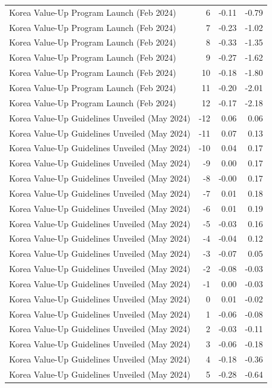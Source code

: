 \begin{table}
\begin{tabular}{lrrr}
Korea Value-Up Program Launch (Feb 2024) & 6 & -0.11 & -0.79 \\
Korea Value-Up Program Launch (Feb 2024) & 7 & -0.23 & -1.02 \\
Korea Value-Up Program Launch (Feb 2024) & 8 & -0.33 & -1.35 \\
Korea Value-Up Program Launch (Feb 2024) & 9 & -0.27 & -1.62 \\
Korea Value-Up Program Launch (Feb 2024) & 10 & -0.18 & -1.80 \\
Korea Value-Up Program Launch (Feb 2024) & 11 & -0.20 & -2.01 \\
Korea Value-Up Program Launch (Feb 2024) & 12 & -0.17 & -2.18 \\
Korea Value-Up Guidelines Unveiled (May 2024) & -12 & 0.06 & 0.06 \\
Korea Value-Up Guidelines Unveiled (May 2024) & -11 & 0.07 & 0.13 \\
Korea Value-Up Guidelines Unveiled (May 2024) & -10 & 0.04 & 0.17 \\
Korea Value-Up Guidelines Unveiled (May 2024) & -9 & 0.00 & 0.17 \\
Korea Value-Up Guidelines Unveiled (May 2024) & -8 & -0.00 & 0.17 \\
Korea Value-Up Guidelines Unveiled (May 2024) & -7 & 0.01 & 0.18 \\
Korea Value-Up Guidelines Unveiled (May 2024) & -6 & 0.01 & 0.19 \\
Korea Value-Up Guidelines Unveiled (May 2024) & -5 & -0.03 & 0.16 \\
Korea Value-Up Guidelines Unveiled (May 2024) & -4 & -0.04 & 0.12 \\
Korea Value-Up Guidelines Unveiled (May 2024) & -3 & -0.07 & 0.05 \\
Korea Value-Up Guidelines Unveiled (May 2024) & -2 & -0.08 & -0.03 \\
Korea Value-Up Guidelines Unveiled (May 2024) & -1 & 0.00 & -0.03 \\
Korea Value-Up Guidelines Unveiled (May 2024) & 0 & 0.01 & -0.02 \\
Korea Value-Up Guidelines Unveiled (May 2024) & 1 & -0.06 & -0.08 \\
Korea Value-Up Guidelines Unveiled (May 2024) & 2 & -0.03 & -0.11 \\
Korea Value-Up Guidelines Unveiled (May 2024) & 3 & -0.06 & -0.18 \\
Korea Value-Up Guidelines Unveiled (May 2024) & 4 & -0.18 & -0.36 \\
Korea Value-Up Guidelines Unveiled (May 2024) & 5 & -0.28 & -0.64 \\

\end{tabular}
\end{table}
